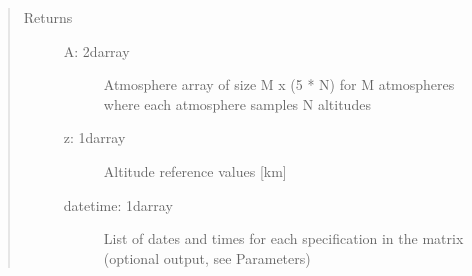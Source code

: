 \documentclass[letterpaper,10pt,english]{sphinxmanual}
\begin{document}
\begin{fulllineitems}
\begin{quote}
\begin{description}
\begin{description}
\end{description}

\item[{Returns}] \leavevmode\begin{description}
\item[{A: 2darray}] \leavevmode
\sphinxAtStartPar
Atmosphere array of size M x (5 * N) for M atmospheres where each atmosphere samples N altitudes

\item[{z: 1darray}] \leavevmode
\sphinxAtStartPar
Altitude reference values {[}km{]}

\item[{datetime: 1darray}] \leavevmode
\sphinxAtStartPar
List of dates and times for each specification in the matrix (optional output, see Parameters)

\end{description}

\end{description}\end{quote}

\end{fulllineitems}

\end{document}
